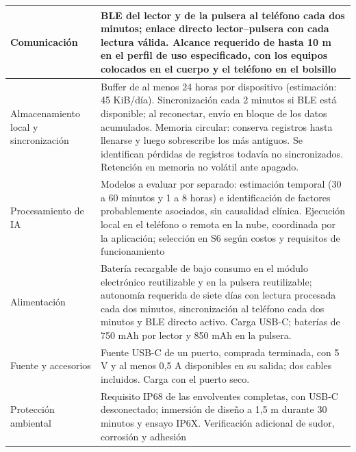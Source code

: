 {\begin{xltabular}{\textwidth}{|>{\raggedright\arraybackslash}p{0.28\textwidth}|>{\raggedright\arraybackslash}X|}
\hline
Comunicación & BLE del lector y de la pulsera al teléfono cada dos minutos; enlace directo lector--pulsera con cada lectura válida. Alcance requerido de hasta 10 m en el perfil de uso especificado, con los equipos colocados en el cuerpo y el teléfono en el bolsillo \\
\hline
Almacenamiento local y sincronización & Buffer de al menos 24 horas por dispositivo (estimación: 45 KiB/día). Sincronización cada 2 minutos si BLE está disponible; al reconectar, envío en bloque de los datos acumulados. Memoria circular: conserva registros hasta llenarse y luego sobrescribe los más antiguos. Se identifican pérdidas de registros todavía no sincronizados. Retención en memoria no volátil ante apagado. \\
\hline
Procesamiento de IA & Modelos a evaluar por separado: estimación temporal (30 a 60 minutos y 1 a 8 horas) e identificación de factores probablemente asociados, sin causalidad clínica. Ejecución local en el teléfono o remota en la nube, coordinada por la aplicación; selección en S6 según costos y requisitos de funcionamiento \\
\hline
Alimentación & Batería recargable de bajo consumo en el módulo electrónico reutilizable y en la pulsera reutilizable; autonomía requerida de siete días con lectura procesada cada dos minutos, sincronización al teléfono cada dos minutos y BLE directo activo. Carga USB-C; baterías de 750 mAh por lector y 850 mAh en la pulsera. \\
\hline
Fuente y accesorios & Fuente USB-C de un puerto, comprada terminada, con 5 V y al menos 0,5 A disponibles en su salida; dos cables incluidos. Carga con el puerto seco. \\
\hline
Protección ambiental & Requisito IP68 de las envolventes completas, con USB-C desconectado; inmersión de diseño a 1,5 m durante 30 minutos y ensayo IP6X. Verificación adicional de sudor, corrosión y adhesión\\
\hline
\end{xltabular}
\par}




